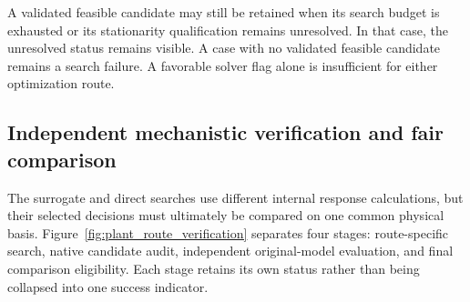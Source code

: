A validated feasible candidate may still be retained when its search budget is exhausted or its stationarity qualification remains unresolved. In that case, the unresolved status remains visible. A case with no validated feasible candidate remains a search failure. A favorable solver flag alone is insufficient for either optimization route.

\subsection{Independent mechanistic verification and fair comparison}

The surrogate and direct searches use different internal response calculations, but their selected decisions must ultimately be compared on one common physical basis. Figure~\ref{fig:plant_route_verification} separates four stages: route-specific search, native candidate audit, independent original-model evaluation, and final comparison eligibility. Each stage retains its own status rather than being collapsed into one success indicator.

